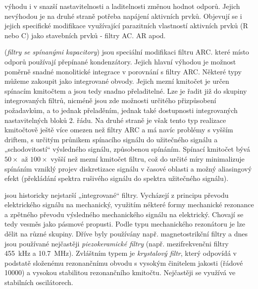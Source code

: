 \begin{description}[noitemsep, font=\small]
              výhodu i v snazší nastavitelnosti a laditelnosti změnou hodnot odporů. Jejich
              nevýhodou je na druhé straně potřeba napájení aktivních prvků. Objevují se i jejich
              specifické modifikace využívající parazitních vlastností aktivních prvků (R nebo C)
              jako stavebních prvků - filtry AC. AR apod.
        \item[\textbf{Filtry ASC}] (\emph{filtry se spínanými kapacitory}) jsou speciální
              modifikaci filtru ARC. které místo odporů používají přepínané kondenzátory. Jejich
              hlavní výhodou je možnost poměrně snadné monolitické integrace v porovnání s filtry
              ARC. Některé typy můžeme zakoupit jako integrované obvody. Jejich mezní kmitočet je
              určen spínacím kmitočtem a jsou tedy snadno přeladitelné. Lze je řadit již do
              skupiny integrovaných filtrů, nicméně jsou zde možnosti určitého přizpůsobení
              požadavkům, a to jednak přeladěním, jednak také dostupnosti integrovaných
              nastavitelných bloků 2. řádu. Na druhé straně je však tento typ realizace kmitočtově
              ještě více omezen než filtry ARC a má navíc problémy s vyšším driftem, s určitým
              průnikem spínacího signálu do užitečného signálu a „schodovitostí“ výsledného
              signálu, způsobenou spínáním. Spínací kmitočet bývá \(\num{50}\times\) až
              \(\num{100}\times\) vyšší než mezní kmitočet filtru, což do určité míry minimalizuje
              spínáním vzniklý projev diskretizace signálu v časové oblasti a možný aliasingový
              efekt (překládání spektra rušivého signálu do spektra užitečného signálu).
        \item[\textbf{Elektromechanické filtry}] jsou historicky nejstarší „integrované“ filtry.
              Vycházejí z principu převodu elektrického signálu na mechanický, využitím nékteré
              formy mechanické rezonance a zpětného převodu výsledného mechanického signálu na
              elektrický. Chovají se tedy vesměs jako pásmové propusti. Podle typu mechanického
              rezonátoru je lze dělit na různé skupiny. Dříve byly používány např. magnetostrikční
              filtry a dnes jsou používané nejčastěji \emph{piezokeramické filtry} (např.
              mezifrekvenčni filtry \qty{455}{\kilo\hertz} a \qty{10.7}{\mega\hertz}).
              Zvláštním typem je \emph{krystalový filtr}, který odpovídá v podstatě složenému
              rezonančnímu obvodu s vysokým činitelem jakosti (řádové \num{10000}) a vysokou
              stabilitou rezonančního kmitočtu. Nejčastěji se využívá ve stabilních oscilátorech.

\end{description}
